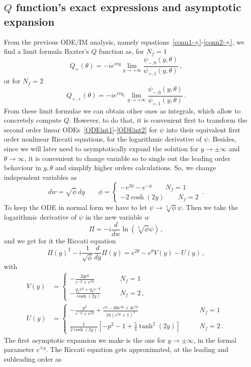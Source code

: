 \documentclass[11pt,a4paper]{elsarticle}
\def \th {\theta}
\def \ba {\begin{aligned}}
\def \ea {\end{aligned}}
\newcommand{\be}{\begin{equation}}
\newcommand{\ee}{\end{equation}}
\def\th{\theta}
\numberwithin{figure}{section}
\numberwithin{table}{section}
\begin{document}
\subsection{$Q$ function's exact expressions and asymptotic expansion}\label{sec:QIntExact}

From the previous ODE/IM analysis, namely equations~\eqref{conn1-+}-\eqref{conn2-+}, we find a limit formula Baxter's $Q$ function as, for $N_f=1$
\be \label{Qdefpsi}
Q_+(\th)=-i e^{i\pi q}\lim_{y\to + \infty}\frac{\psi_{-,0}(y,\th)}{\psi_{+,1}(y,\th)}\,,
\ee
or for $N_f=2$
\be
Q_{+,+}(\th)=-i e^{i\pi q_1}\lim_{y\to + \infty}\frac{\psi_{-,0}(y,\th)}{\psi_{+,1}(y,\th)}\,.
\ee
From these limit formulae we can obtain other ones as integrals, which allow to concretely compute $Q$. However, to do that, it is convenient first to transform the second order linear ODEs~\eqref{ODEint1}-\eqref{ODEint2} for $\psi$ into their equivalent first order nonlinear Riccati equations, for the logarithmic derivative of $\psi$. Besides, since we will later need to asymptotically expand the solution for $y \to \pm \infty$ and $\th \to \infty$, it is convenient to change variable so to single out the leading order behaviour in $y,\th$ and simplify higher orders calculations. So, we change independent variables as 
\be 
d w = \sqrt{\phi} \,d y \qquad \phi = \begin{cases} 
-e^{2y}-e^{-y} \qquad N_f=1\\
-2 \cosh(2y) \qquad N_f=2
\end{cases}\,.
\ee 
To keep the ODE in normal form we have to let $\psi \to \sqrt[4]{\phi} \psi$. Then we take the logarithmic derivative of $\psi$ in the new variable $w$
\be 
\Pi = - i\frac{d}{dw} \ln( \sqrt[4]{\phi} \psi)\,,
\ee 
and we get for it the Riccati equation
\be  \label{eqRiccatiGen}
\Pi(y)^2 - i \frac{1}{\sqrt{\phi}}\frac{d}{dy}\Pi(y) =e^{2\th}-e^\th V(y) -U(y) \,,
\ee
with 
\be 
\ba
V(y) &= \begin{cases}
-\frac{ 2 q   e^y}{e^{-y}+e^{2 y}} \qquad &N_f=1 \\
-\frac{q_1 e^y +q_2 e^{-y} }{\cosh(2y)}\qquad &N_f=2\,,
\end{cases}\\
U(y) &= \begin{cases}
-\frac{p^2}{e^{-y}+e^{2 y}}+\frac{e^y-40 e^{4 y}+4 e^{7 y}}{16 \left(e^{3 y}+1\right)^3} \qquad &N_f=1\\
\frac{1}{2\cosh(2y)}\left[ -p^2-1+\frac{5}{4} \tanh ^2(2 y)\right]\qquad &N_f=2\,.
\end{cases}
\ea
\ee  
The first asymptotic expansion we make is the one for $y \to \pm\infty$, in the formal parameter $e^{\mp y}$. The Riccati equation gets approximated, at the leading and subleading order as
\end{document}
